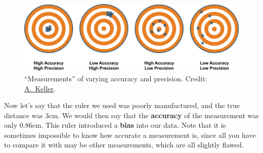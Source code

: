 \documentclass[12pt]{article}%
\begin{document}
\begin{figure}[h!]
\begin{centering}
\includegraphics[width=\columnwidth]{acc_prec.jpeg}
\caption{``Measurements'' of varying accuracy and precision.
Credit:
\href{http://kaffee.50webs.com/Science/images/Accuracy-vs-precision1.jpg}{A.~Keller}.
}
\end{centering}
\end{figure}

Now let's say that the ruler we used was poorly manufactured, and the
true distance was $3\mathrm{cm}$. We would then say that the {\bf accuracy}
of the measurement was only $0.86\mathrm{cm}$. This ruler introduced a {\bf bias} into our data.
Note that it is sometimes
impossible to know how accurate a measurement is, since all you have
to compare it with may be other measurements, which are all slightly flawed.

%
\end{document}

